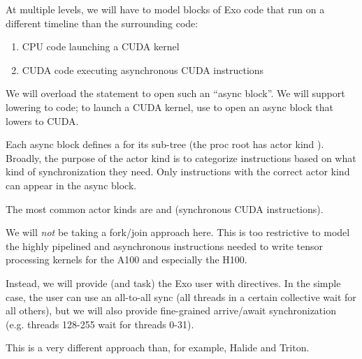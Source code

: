 

\filbreak
{}
At multiple levels, we will have to model blocks of Exo code that run on a different timeline than the surrounding code:
\begin{enumerate}
  \item CPU code launching a CUDA kernel
  \item CUDA code executing asynchronous CUDA instructions
\end{enumerate}
We will overload the  statement to open such an ``async block''.
We will support lowering to  code; to launch a CUDA kernel, use  to open an async block that lowers to CUDA.

Each async block defines a  for its sub-tree (the proc root has actor kind ).
Broadly, the purpose of the actor kind is to categorize instructions based on what kind of synchronization they need.
Only instructions with the correct actor kind can appear in the async block.

The most common actor kinds are  and  (synchronous CUDA instructions).

\filbreak
{}
We will \textit{not} be taking a fork/join approach here.
This is too restrictive to model the highly pipelined and asynchronous instructions needed to write tensor processing kernels for the A100 and especially the H100.

Instead, we will provide (and task) the Exo user with  directives.
In the simple case, the user can use an all-to-all sync (all threads in a certain collective wait for all others),
but we will also provide fine-grained arrive/await synchronization (e.g. threads 128-255 wait for threads 0-31).

This is a very different approach than, for example, Halide and Triton.

\filbreak
{}

